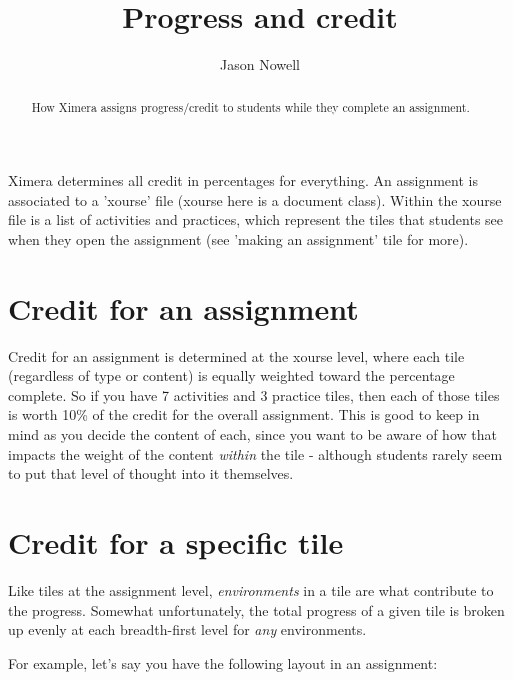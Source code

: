 \documentclass{ximera}
\title{Progress and credit}
\author{Jason Nowell}
\begin{document}
\begin{abstract}
    How Ximera assigns progress/credit to students while they complete an
    assignment.
\end{abstract}
\maketitle

Ximera determines all credit in percentages for everything. An assignment is
associated to a 'xourse' file (xourse here is a document class). Within the
xourse file is a list of activities and practices, which represent the tiles
that students see when they open the assignment (see 'making an assignment'
tile for more).

\section{Credit for an assignment}
Credit for an assignment is determined at the xourse level, where each
tile (regardless of type or content) is equally weighted toward the percentage
complete. So if you have 7 activities and 3 practice tiles, then each of those
tiles is worth 10\% of the credit for the overall assignment. This is good to
keep in mind as you decide the content of each, since you want to be aware of
how that impacts the weight of the content \textit{within} the tile - although
students rarely seem to put that level of thought into it themselves.

\section{Credit for a specific tile}
Like tiles at the assignment level, \textit{environments} in a tile are
what contribute to the progress. Somewhat unfortunately, the total progress of
a given tile is broken up evenly at each breadth-first level for \textit{any}
environments.

For example, let's say you have the following layout in an assignment:
\end{document}
